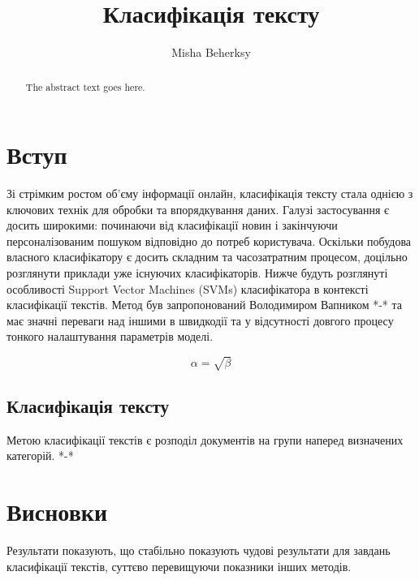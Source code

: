 \documentclass[14pt]{article}
\begin{document}
\title{Класифікація тексту}
\author{Misha Beherksy}

\maketitle

\begin{abstract}
The abstract text goes here.
\end{abstract}

\section{Вступ}
Зі стрімким ростом об'єму інформації онлайн, класифікація тексту стала однією з ключових
технік для обробки та впорядкування даних. Галузі застосування є досить широкими: 
починаючи від класифікації новин і закінчуючи персоналізованим пошуком відповідно до
потреб користувача. Оскільки побудова власного класифікатору є досить складним та
часозатратним процесом, доцільно розглянути приклади уже існуючих класифікаторів.
Нижче будуть розглянуті особливості  Support Vector Machines (SVMs) класифікатора в контексті класифікації текстів. Метод був запропонований Володимиром Вапником *-* та 
має значні переваги над іншими в швидкодії та у відсутності довгого процесу тонкого 
налаштування параметрів моделі.

\begin{equation}
    \label{simple_equation}
    \alpha = \sqrt{ \beta }
\end{equation}

\subsection{Класифікація тексту}
Метою класифікації текстів є розподіл документів на групи наперед визначених категорій. *-*


\section{Висновки}
Результати показують, що стабільно показують чудові результати для завдань класифікації
текстів, суттєво перевищуючи показники інших методів.
\end{document}
